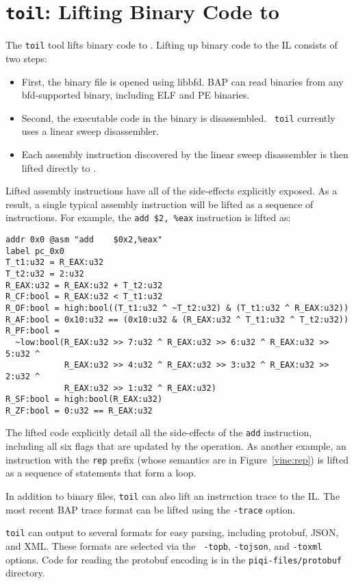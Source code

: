 \section{\texttt{toil}: Lifting Binary Code to \bil}

The {\tt toil} tool lifts binary code to \bil.  Lifting up binary code
to the IL consists of two steps:
\begin{itemize}
\item First, the binary file is opened using libbfd. BAP can read
  binaries from any bfd-supported binary, including ELF and PE
  binaries.

\item Second, the executable code in the binary is disassembled.  {\tt
  toil} currently uses a linear sweep disassembler.

\item Each assembly instruction discovered by the linear sweep disassembler
  is then lifted directly to \bil.
\end{itemize}

Lifted assembly instructions have all of the side-effects explicitly
exposed.  As a result, a single typical assembly instruction will be
lifted as a sequence of \bil instructions.  For example, the {\tt add
  \$2, \%eax} instruction is lifted as:

\begin{centering}
\begin{scriptsize}
\begin{verbatim}
addr 0x0 @asm "add    $0x2,%eax"
label pc_0x0
T_t1:u32 = R_EAX:u32
T_t2:u32 = 2:u32
R_EAX:u32 = R_EAX:u32 + T_t2:u32
R_CF:bool = R_EAX:u32 < T_t1:u32
R_OF:bool = high:bool((T_t1:u32 ^ ~T_t2:u32) & (T_t1:u32 ^ R_EAX:u32))
R_AF:bool = 0x10:u32 == (0x10:u32 & (R_EAX:u32 ^ T_t1:u32 ^ T_t2:u32))
R_PF:bool =
  ~low:bool(R_EAX:u32 >> 7:u32 ^ R_EAX:u32 >> 6:u32 ^ R_EAX:u32 >> 5:u32 ^
            R_EAX:u32 >> 4:u32 ^ R_EAX:u32 >> 3:u32 ^ R_EAX:u32 >> 2:u32 ^
            R_EAX:u32 >> 1:u32 ^ R_EAX:u32)
R_SF:bool = high:bool(R_EAX:u32)
R_ZF:bool = 0:u32 == R_EAX:u32
\end{verbatim}
\end{scriptsize}
\end{centering}

The lifted \bil code explicitly detail all the side-effects of the
{\tt add} instruction, including all six flags that are updated by the
operation.  As another example, an instruction with the {\tt rep}
prefix (whose semantics are in Figure~\ref{vine:rep}) is lifted as a
sequence of statements that form a loop.

In addition to binary files, {\tt toil} can also lift an instruction
trace to the IL.  The most recent BAP trace format can be lifted using
the {\tt -trace} option.

{\tt toil} can output to several formats for easy parsing, including
protobuf, JSON, and XML.  These formats are selected via the {\tt
  -topb}, {\tt -tojson}, and {\tt -toxml} options.  Code for reading
the protobuf encoding is in the {\tt piqi-files/protobuf} directory.


